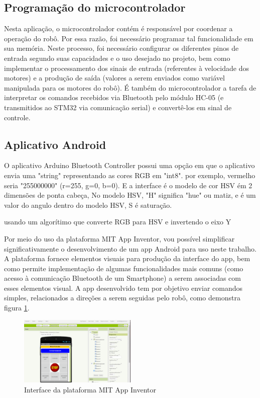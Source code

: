 \subsection{Programação do microcontrolador}
Nesta aplicação, o microcontrolador contém é responsável por coordenar a operação do robô. Por essa razão, foi
necessário programar tal funcionalidade em sua memória. Neste processo, foi necessário configurar os diferentes pinos de
entrada segundo suas capacidades e o uso desejado no projeto, bem como implementar o processamento dos sinais de entrada
(referentes à velocidade dos motores) e a produção de saída (valores a serem enviados como variável manipulada para os
motores do robô). É também do microcontrolador a tarefa de interpretar os comandos recebidos via Bluetooth pelo módulo 
HC-05 (e transmitidos ao STM32 via comunicação serial) e convertê-los em sinal de controle.

\subsection{Aplicativo Android}

O aplicativo Arduino Bluetooth Controller possui uma opção em que o aplicativo envia uma "string" representando as cores RGB em "int8".
por exemplo,  vermelho seria "255000000" (r=255, g=0, b=0). E a interface é o modelo de cor HSV ém 2 dimensões de ponta cabeça,
No modelo HSV, "H" significa "hue" ou matiz, e é um valor do angulo dentro do modelo HSV,  S é saturação.

usando um algorítimo que converte RGB para HSV e invertendo o eixo Y

Por meio do uso da plataforma MIT App Inventor, vou possível simplificar significativamente o desenvolvimento de um app
Android para uso neste trabalho. A plataforma fornece elementos visuais para produção da interface do app, bem como 
permite implementação de algumas funcionalidades mais comuns (como acesso à comunicação Bluetooth de um Smartphone) a 
serem associadas com esses elementos visual. A app desenvolvido tem por objetivo enviar comandos simples, relacionados
a direções a serem seguidas pelo robô, como demonstra figura \ref{fig:mit_app_inventor}.

\begin{figure}[htb]
	\centering
	\includegraphics[width=0.5\textwidth]{figures/mit_app_inventor.png}
	\caption{Interface da plataforma MIT App Inventor}
	\label{fig:mit_app_inventor}
\end{figure}